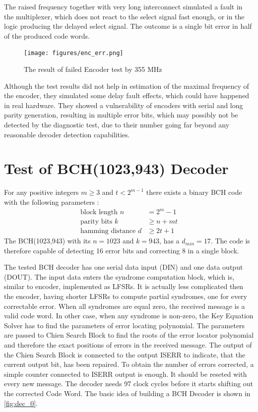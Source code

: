 The raised frequency together with very long interconnect simulated a fault in the multiplexer, which does not react to the select signal fast enough, or in the logic producing the delayed select signal. The outcome is a single bit error in half of the produced code words.

\begin{figure}[h]
\centering
\texttt{[image: figures/enc\_err.png]}
\caption{The result of failed Encoder test by 355 MHz}
\label{fig:enc_1}
\end{figure}



Although the test results did not help in estimation of the maximal frequency of the encoder, they simulated some delay fault effects, which could have happened in real hardware. They showed a vulnerability of encoders with serial and long parity generation, resulting in multiple error bits, which may possibly not be detected by the diagnostic test, due to their number going far beyond any reasonable decoder detection capabilities.

\section{Test of BCH(1023,943) Decoder}
For any positive integers $m \geq 3$ and $t<2^{m-1}$ there exists a binary BCH code with the following parameters \cite{art:BCH_implement}:
\begin{subequations}
\begin{align}
    \text{block length }n&=2^{m}-1\label{eq:blck_len}\\
    \text{parity bits }k&\geq n+mt\label{eq:parity}\\
    \text{hamming distance }d&\geq2t+1\label{eq:dmin}
\end{align}
\end{subequations}
The BCH(1023,943) with its $n = 1023$ and $k=943$, has a $d_{min}= 17$. The code is therefore capable of detecting 16 error bits and correcting 8 in a single block. 

The tested BCH decoder has one serial data input (DIN) and one data output (DOUT). The input data enters the syndrome computation block, which is, similar to encoder, implemented as LFSRs. It is actually less complicated then the encoder, having shorter LFSRs to compute partial syndromes, one for every correctable error. When all syndromes are equal zero, the received message is a valid code word. In other case, when any syndrome is non-zero, the Key Equation Solver has to find the parameters of error locating polynomial. The parameters are passed to Chien Search Block to find the roots of the error locator polynomial and therefore the exact positions of errors in the received message. The output of the Chien Search Block is connected to the output ISERR to indicate, that the current output bit, has been repaired. To obtain the number of errors corrected, a simple counter connected to ISERR output is enough. It should be reseted with every new message. The decoder needs 97 clock cycles before it starts shifting out the corrected Code Word. The basic idea of building a BCH Decoder is shown in \autoref{fig:dec_0}.

